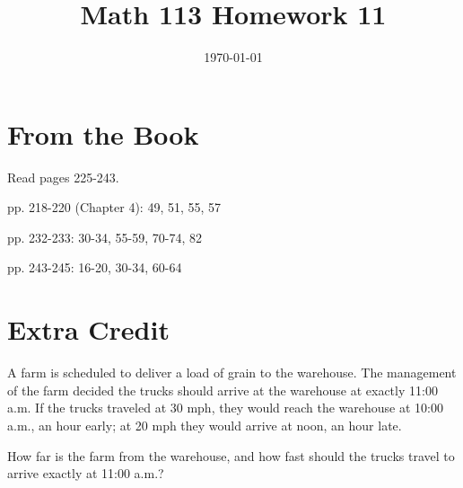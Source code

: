\documentclass[fleqn,addpoints]{exam}
\title{Math 113 Homework 11}
\author{}
\date{\today}
\begin{document}
\maketitle

\section{From the Book}

Read pages 225-243.

\begin{itemize*}
  \item pp. 218-220 (Chapter 4): 49, 51, 55, 57
  \item pp. 232-233: 30-34, 55-59, 70-74, 82
  \item pp. 243-245: 16-20, 30-34, 60-64
\end{itemize*}


\section{Extra Credit}

A farm is scheduled to deliver a load of grain to the warehouse.  The management of the farm decided the trucks should
arrive at the warehouse at exactly 11:00 a.m.  If the trucks traveled at 30 mph, they would reach the warehouse at 10:00
a.m., an hour early; at 20 mph they would arrive at noon, an hour late.

How far is the farm from the warehouse, and how fast should the trucks travel to arrive exactly at 11:00 a.m.?

\ifprintanswers
\pagebreak
\fi
\end{document}
